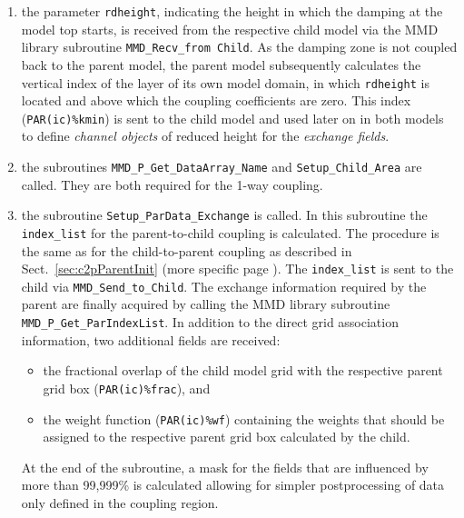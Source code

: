 \documentclass[11pt,twoside]{article}
\begin{document}
\begin{itemize}
\begin{enumerate} %
\item  the parameter 
\verb|rdheight|, indicating the height in which the damping at the model top
starts, is received from the respective child model 
via the MMD library subroutine \verb|MMD_Recv_from Child|.
As the damping zone is not coupled back to the parent model, the parent model
subsequently calculates the vertical index of the layer of its own model
domain, in which \verb|rdheight| is
located and above which the coupling coefficients are zero.
This index (\verb|PAR(ic)%kmin|) is sent to the child model and used later on 
in both models to define {\it channel objects} of reduced height for the {\it
exchange fields}. 
\item the subroutines \verb|MMD_P_Get_DataArray_Name|
and \verb|Setup_Child_Area| are called. They are both required for the 1-way
coupling.
\item the subroutine \verb|Setup_ParData_Exchange| is called. In this
subroutine the \verb|index_list| for the parent-to-child coupling is calculated.
The procedure is the same as for the child-to-parent coupling as
described in Sect.\ \ref{sec:c2pParentInit}
(more specific
page \pageref{page:calindexlist}). The \verb|index_list| is sent to the child 
via \verb|MMD_Send_to_Child|. The exchange information required by the
parent are finally acquired by calling the MMD library
subroutine \verb|MMD_P_Get_ParIndexList|. In addition to the direct grid
association information, two additional fields are received:
\begin{itemize} %
\item the fractional overlap of the child model grid with
the respective parent grid box (\verb|PAR(ic)%frac|), and 
\item the weight function
(\verb|PAR(ic)%wf|) containing the weights that should be assigned to the
respective parent grid box calculated by the child.
\end{itemize} %
At the end of the subroutine, a mask for the fields that are influenced by
more than 99,999\% is calculated allowing for simpler postprocessing of data
only defined in the coupling region.


\end{enumerate}
\end{itemize}
\end{document}
